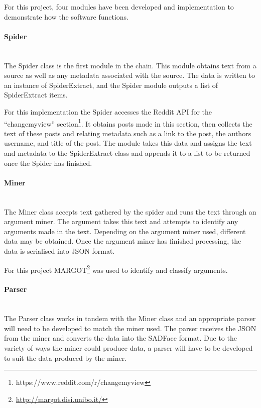 \documentclass[12pt,a4paper]{article}
\begin{document}
For this project, four modules have been developed and implementation to demonstrate how the software functions.

\paragraph{Spider}\mbox{}\\

The Spider class is the first module in the chain. This module obtains text from a source as well as any metadata associated with the source. The data is written to an instance of SpiderExtract, and the Spider module outputs a list of SpiderExtract items.

For this implementation the Spider accesses the Reddit API for the ``changemyview'' section\footnote{https://www.reddit.com/r/changemyview}. It obtains posts made in this section, then collects the text of these posts and relating metadata such as a link to the post, the authors username, and title of the post. The module takes this data and assigns the text and metadata to the SpiderExtract class and appends it to a list to be returned once the Spider has finished. 

\paragraph{Miner}\mbox{}\\

The Miner class accepts text gathered by the spider and runs the text through an argument miner. The argument takes this text and attempts to identify any arguments made in the text. Depending on the argument miner used, different data may be obtained. Once the argument miner has finished processing, the data is serialised into JSON format.

For this project MARGOT\footnote{\url{http://margot.disi.unibo.it/}} was used to identify and classify arguments.

\paragraph{Parser}\mbox{}\\

The Parser class works in tandem with the Miner class and an appropriate parser will need to be developed to match the miner used. The parser receives the JSON from the miner and converts the data into the SADFace format. Due to the variety of ways the miner could produce data, a parser will have to be developed to suit the data produced by the miner.
\end{document}
